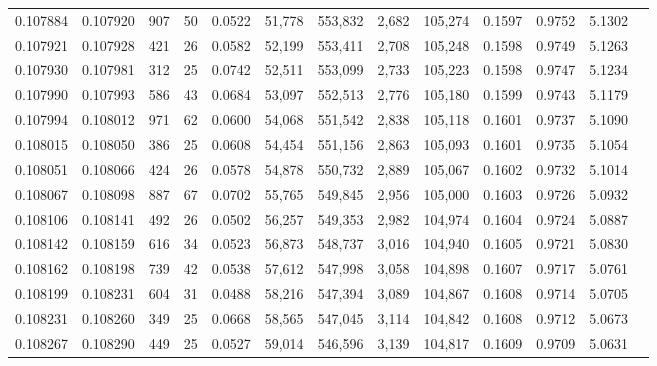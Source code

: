 \begin{tabular}{rrrrrrrrrrrrr}
0.107884 & 0.107920 &   907 &  50 &                                     0.0522 &  51,778 & 553,832 &   2,682 & 105,274 & 0.1597 & 0.9752 & 5.1302 \\
0.107921 & 0.107928 &   421 &  26 &                                     0.0582 &  52,199 & 553,411 &   2,708 & 105,248 & 0.1598 & 0.9749 & 5.1263 \\
0.107930 & 0.107981 &   312 &  25 &                                     0.0742 &  52,511 & 553,099 &   2,733 & 105,223 & 0.1598 & 0.9747 & 5.1234 \\
0.107990 & 0.107993 &   586 &  43 &                                     0.0684 &  53,097 & 552,513 &   2,776 & 105,180 & 0.1599 & 0.9743 & 5.1179 \\
0.107994 & 0.108012 &   971 &  62 &                                     0.0600 &  54,068 & 551,542 &   2,838 & 105,118 & 0.1601 & 0.9737 & 5.1090 \\
0.108015 & 0.108050 &   386 &  25 &                                     0.0608 &  54,454 & 551,156 &   2,863 & 105,093 & 0.1601 & 0.9735 & 5.1054 \\
0.108051 & 0.108066 &   424 &  26 &                                     0.0578 &  54,878 & 550,732 &   2,889 & 105,067 & 0.1602 & 0.9732 & 5.1014 \\
0.108067 & 0.108098 &   887 &  67 &                                     0.0702 &  55,765 & 549,845 &   2,956 & 105,000 & 0.1603 & 0.9726 & 5.0932 \\
0.108106 & 0.108141 &   492 &  26 &                                     0.0502 &  56,257 & 549,353 &   2,982 & 104,974 & 0.1604 & 0.9724 & 5.0887 \\
0.108142 & 0.108159 &   616 &  34 &                                     0.0523 &  56,873 & 548,737 &   3,016 & 104,940 & 0.1605 & 0.9721 & 5.0830 \\
0.108162 & 0.108198 &   739 &  42 &                                     0.0538 &  57,612 & 547,998 &   3,058 & 104,898 & 0.1607 & 0.9717 & 5.0761 \\
0.108199 & 0.108231 &   604 &  31 &                                     0.0488 &  58,216 & 547,394 &   3,089 & 104,867 & 0.1608 & 0.9714 & 5.0705 \\
0.108231 & 0.108260 &   349 &  25 &                                     0.0668 &  58,565 & 547,045 &   3,114 & 104,842 & 0.1608 & 0.9712 & 5.0673 \\
0.108267 & 0.108290 &   449 &  25 &                                     0.0527 &  59,014 & 546,596 &   3,139 & 104,817 & 0.1609 & 0.9709 & 5.0631 \\

\end{tabular}

